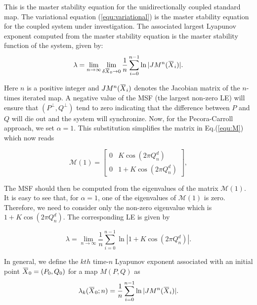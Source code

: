\documentclass[reprint,amsmath,amssymb,aps,pre]{revtex4-1}
\newcommand{\overbar}[1]{\mkern 1.5mu\overline{\mkern-1.5mu#1\mkern-1.5mu}\mkern 1.5mu}
\begin{document}
This is the master stability equation for the unidirectionally coupled 
standard map. The variational equation (\ref{equ:variational}) is the master 
stability equation for the coupled system under investigation. The associated 
largest Lyapunov exponent computed from the master stability equation is the 
master stability function of the system, given by:
\begin{equation}
\label{equ:msf}
\lambda  = \lim_{n \rightarrow \infty} \lim_{\delta\overbar{X}_0\rightarrow 
0}\frac{1}{n}\sum^{n-1}_{i=0}\ln|JM^n(\overbar{X}_i)|.
\end{equation}

Here $n$ is a positive integer and $JM^n(\overbar{X}_i)$ denotes the Jacobian matrix of the $n$-times iterated map.  A negative value of the MSF (the largest non-zero LE) will ensure that $(P^\perp,Q^\perp) $ tend to zero indicating that the difference between $P$ and $Q$ will die out and the system will synchronize. 
Now, for the Pecora-Carroll approach, we set $\alpha = 1$. This substitution simplifies the matrix in Eq.(\ref{equ:M}) which now reads

\begin{equation} 
\mathcal{M}(1)= \begin{bmatrix} 0 & K\cos(2\pi Q^d_n) \\ 0 & 1 + K\cos(2\pi 
Q^d_n) \end{bmatrix},
\end{equation}

The MSF should then be computed from the eigenvalues of the matrix $\mathcal{M}(1)$. It is easy to see that, for $\alpha =1$, one of the eigenvalues of   $\mathcal{M}(1)$ is zero. Therefore, we need to consider only the non-zero eigenvalue which is $1+K\cos(2\pi Q^d_n)$. The corresponding LE is given by

\begin{equation}
\label{equ:LE}
\lambda   = \lim_{n \rightarrow \infty} 
\frac{1}{n}\sum^{n-1}_{i=0}\ln|1+K\cos(2\pi Q^d_n)|.
\end{equation}

In general, we define the $kth$ time-$n$ Lyapunov exponent associated with an initial point $\overbar{X}_0 = (P_0,Q_0)$ for a map $M(P,Q)$ as
\begin{equation}
\label{equ:FLEf}
\lambda _k(\overbar{X}_0;n)  = 
\frac{1}{n}\sum^{n-1}_{i=0}\ln|JM^n(\overbar{X}_i)|.
\end{equation}
\end{document}
